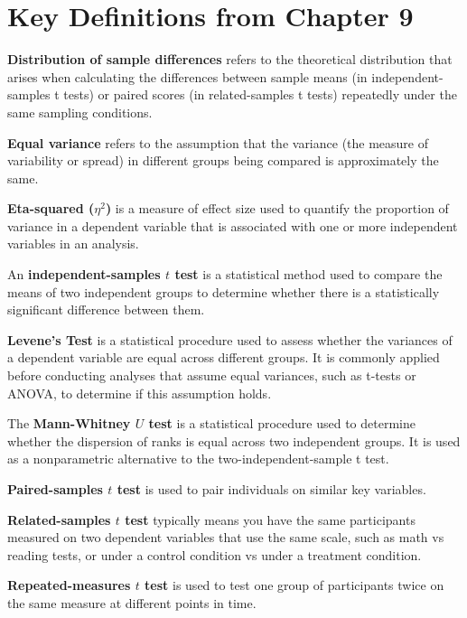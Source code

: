 \documentclass[
  letterpaper,
  DIV=11,
  numbers=noendperiod]{scrreprt}
\begin{document}
\section*{Key Definitions from Chapter
9}\label{key-definitions-from-chapter-9}


\textbf{Distribution of sample differences} refers to the theoretical
distribution that arises when calculating the differences between sample
means (in independent-samples t tests) or paired scores (in
related-samples t tests) repeatedly under the same sampling conditions.

\textbf{Equal variance} refers to the assumption that the variance (the
measure of variability or spread) in different groups being compared is
approximately the same.

\textbf{Eta-squared (\(\eta^2\))} is a measure of effect size used to
quantify the proportion of variance in a dependent variable that is
associated with one or more independent variables in an analysis.

An \textbf{independent-samples \(t\) test} is a statistical method used
to compare the means of two independent groups to determine whether
there is a statistically significant difference between them.

\textbf{Levene's Test} is a statistical procedure used to assess whether
the variances of a dependent variable are equal across different groups.
It is commonly applied before conducting analyses that assume equal
variances, such as t-tests or ANOVA, to determine if this assumption
holds.

The \textbf{Mann-Whitney \(U\) test} is a statistical procedure used to
determine whether the dispersion of ranks is equal across two
independent groups. It is used as a nonparametric alternative to the
two-independent-sample t test.

\textbf{Paired-samples \(t\) test} is used to pair individuals on
similar key variables.

\textbf{Related-samples \(t\) test} typically means you have the same
participants measured on two dependent variables that use the same
scale, such as math vs reading tests, or under a control condition vs
under a treatment condition.

\textbf{Repeated-measures \(t\) test} is used to test one group of
participants twice on the same measure at different points in time.
\end{document}
